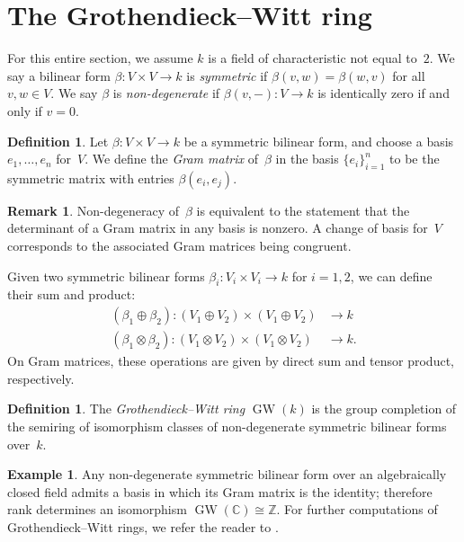 \documentclass[12pt]{amsart}
\theoremstyle{definition}
\newtheorem{definition}[theorem]{Definition}
\newtheorem{example}[theorem]{Example}
\newtheorem{remark}[theorem]{Remark}
\DeclareMathOperator{\GW}{GW}
\begin{document}
\section{The Grothendieck--Witt ring}\label{sec:GWring}

For this entire section, we assume $k$ is a field of characteristic not equal to~$2$. We say a bilinear form $\beta \colon V \times V \to k$ is \emph{symmetric} if $\beta(v,w) = \beta(w,v)$ for all $v,w\in V$. We say $\beta$ is \emph{non-degenerate} if $\beta(v,-) \colon V \to k$ is identically zero if and only if $v=0$.

\begin{definition}\label{def:gram-matrix} 
Let $\beta \colon V \times V \to k$ be a symmetric bilinear form, and choose a basis $e_1, \dots, e_n$ for~$V$. We define the \emph{Gram matrix} of~$\beta$ in the basis $\{e_i\}_{i=1}^n$ to be the symmetric matrix with entries $\beta(e_i,e_j)$. 
\end{definition}

\begin{remark}
    Non-degeneracy of~$\beta$ is equivalent to the statement that the determinant of a Gram matrix in any basis is nonzero. A change of basis for~$V$ corresponds to the associated Gram matrices being congruent.
\end{remark}

Given two symmetric bilinear forms $\beta_i \colon V_i \times V_i \to k$ for $i=1,2$, we can define their sum and product:
\begin{equation}\label{eqn:add-multiply-symm-bilin-forms}
\begin{aligned}
    (\beta_1 \oplus \beta_2) \colon (V_1 \oplus V_2 )\times (V_1 \oplus V_2) &\to k \\
    (\beta_1 \otimes \beta_2) \colon (V_1 \otimes V_2) \times( V_1 \otimes V_2) &\to k.
\end{aligned}
\end{equation}
On Gram matrices, these operations are given by direct sum and tensor product, respectively.

\begin{definition}\label{def:GWk} 
The \emph{Grothendieck--Witt ring} $\GW(k)$ is the group completion of the semiring of isomorphism classes of non-degenerate symmetric bilinear forms over~$k$. 
\end{definition}

\begin{example}
\label{example-5}
Any non-degenerate symmetric bilinear form over an algebraically closed field admits a basis in which its Gram matrix is the identity; therefore rank determines an isomorphism $\GW(\mathbb{C}) \cong \mathbb{Z}$. For further computations of Grothendieck--Witt rings, we refer the reader to \cite[Chapter~II]{Lam}.
\end{example}
\end{document}
